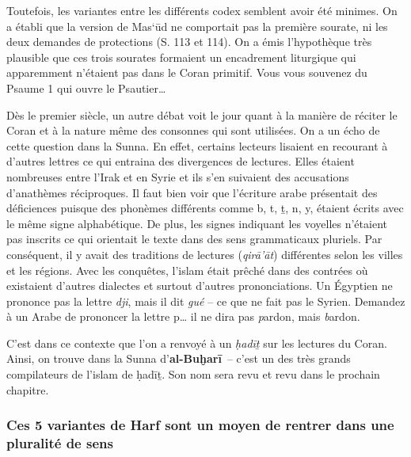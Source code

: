 Toutefois, les variantes entre les différents codex semblent avoir été
minimes. On a établi que la version de Mas`ūd ne comportait pas la
première sourate, ni les deux demandes de protections (S. 113 et 114).
On a émis l'hypothèque très plausible que ces trois sourates formaient
un encadrement liturgique qui apparemment n'étaient pas dans le Coran
primitif. Vous vous souvenez du Psaume 1 qui ouvre le Psautier\ldots{}

Dès le premier siècle, un autre débat voit le jour quant à la manière de
réciter le Coran et à la nature même des consonnes qui sont utilisées.
On a un écho de cette question dans la Sunna.  En effet, certains
lecteurs lisaient en recourant à d'autres lettres ce qui entraina des
divergences de lectures. Elles étaient nombreuses entre l'Irak et en
Syrie et ils s'en suivaient des accusations d'anathèmes réciproques. Il
faut bien voir que l'écriture arabe présentait des déficiences puisque
des phonèmes différents comme b, t, ṯ, n, y, étaient écrits avec le même
signe alphabétique. De plus, les signes indiquant les voyelles n'étaient
pas inscrits ce qui orientait le texte dans des sens grammaticaux
pluriels. Par conséquent, il y avait des traditions de lectures
(\emph{qirā'āt}) différentes selon les villes et les régions. Avec les
conquêtes, l'islam était prêché dans des contrées où existaient d'autres
dialectes et surtout d'autres prononciations. Un Égyptien ne prononce
pas la lettre \emph{dji}, mais il dit \emph{gué} -- ce que ne fait pas
le Syrien. Demandez à un Arabe de prononcer la lettre p\ldots{} il ne
dira pas \emph{p}ardon, mais \emph{b}ardon.

C'est dans ce contexte que l'on a renvoyé à un \emph{ḥadīṯ} sur les
lectures du Coran. Ainsi, on trouve dans la Sunna
d'\textbf{al-Buḫarī}~-- c'est un des très grands compilateurs de l'islam
de ḥadīṯ. Son nom sera revu et revu dans le prochain chapitre.




\subsubsection{Ces 5 variantes de Harf sont un moyen de rentrer dans une
pluralité de
sens}



